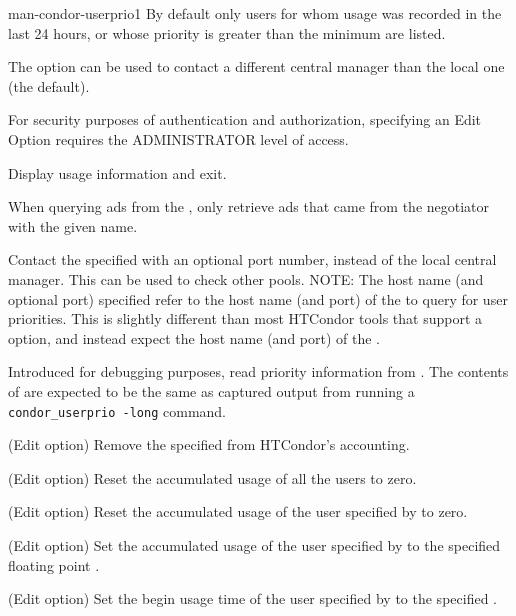 \begin{ManPage}{}{man-condor-userprio}{1}
By default only users for whom usage was recorded in the last 24 hours, 
or whose priority is greater than the minimum are listed.

The  option can be used to contact a different central manager 
than the local one (the default).


For security purposes of authentication and authorization,
specifying an Edit Option requires the ADMINISTRATOR level of access.

\begin{Options}

  {Display usage information and exit.}

  {When querying ads from the , only retrieve ads
  that came from the negotiator with the given name.}

  {Contact the specified  with an
  optional port number, instead of the local central manager. 
  This can be used to check other pools.  
  NOTE: The host name (and optional port) specified refer to the host name
  (and port) of the  to query for user priorities.
  This is slightly different than most HTCondor tools
  that support a  option,
  and instead expect the host name (and port) of the .}

  {Introduced for debugging purposes,
   read priority information from .
   The contents of  are expected to be the same as captured
   output from running a \texttt{condor\_userprio -long} command.}

  {(Edit option) Remove the specified  from HTCondor's accounting.}

  {(Edit option) Reset the accumulated usage of all the users to zero.}

  {(Edit option) Reset the accumulated usage of the user specified by
   to zero. }

  {(Edit option) Set the accumulated usage of the user specified by
   to the specified floating point . }

  {(Edit option) Set the begin usage time of the user specified by
   to the specified . }


\end{Options}
\end{ManPage}
